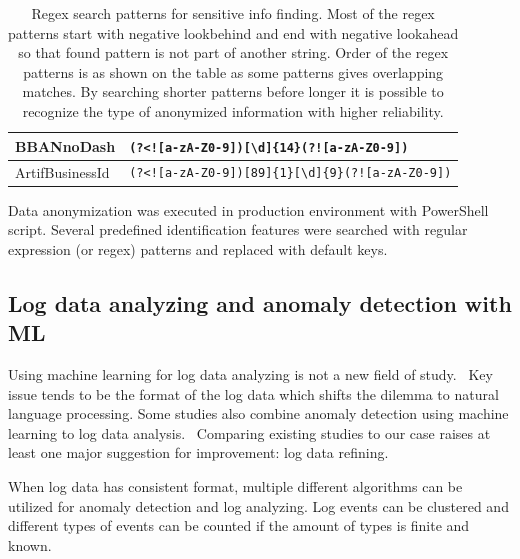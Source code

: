 \begin{table}[]
\begin{tabularx}{\textwidth}{|L{0.18\textwidth}|Y|}
        BBANnoDash &
        \tiny{\verb=(?<![a-zA-Z0-9])[\d]{14}(?![a-zA-Z0-9])=}
         \\ \hline
        ArtifBusinessId &
        \tiny{\verb=(?<![a-zA-Z0-9])[89]{1}[\d]{9}(?![a-zA-Z0-9])=}
         \\ \hline
    \end{tabularx}
    \caption{Regex search patterns for sensitive info finding.
    Most of the regex patterns start with negative lookbehind
    and end with negative lookahead
    so that found pattern is not part of another string.
    Order of the regex patterns is as shown on the table
    as some patterns gives overlapping matches.
    By searching shorter patterns before longer
    it is possible to recognize the type of anonymized information
    with higher reliability.}
    \label{tab:regex-sensitive-info2}
\end{table}

Data anonymization was executed in production environment
with PowerShell script.
Several predefined identification features were searched with
regular expression (or regex) patterns and replaced with
default keys.



\subsection{Log data analyzing and anomaly detection with ML}\label{subsec:bg-log-data-analyzing-and-anomaly-detection-with-ml}

Using machine learning for log data analyzing
is not a new field of study.~\cite{rantala2019applying,allagi2019analysis,kondo2017early,cao2017machine}
Key issue tends to be the format of the log data
which shifts the dilemma to natural language processing.
Some studies also combine anomaly detection using machine learning
to log data analysis.~\cite{liu2019loganomaly, zhang2019robust}
Comparing existing studies to our case
raises at least one major suggestion for improvement:
log data refining.

When log data has consistent format,
multiple different algorithms can be utilized
for anomaly detection and log analyzing.
Log events can be clustered
and different types of events can be counted
if the amount of types is finite and known.~\cite{liu2019loganomaly}

